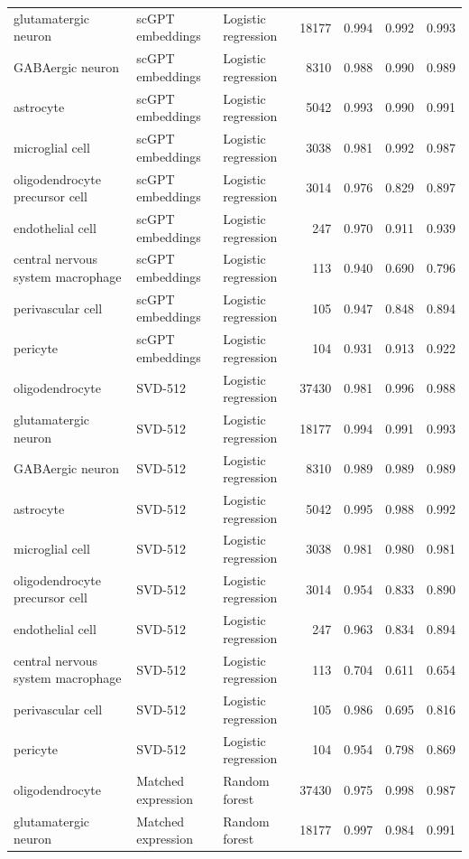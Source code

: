 {\begin{longtable}{>{\raggedright\arraybackslash}p{4.2cm}llrrrr}
glutamatergic neuron & scGPT embeddings & Logistic regression & 18177 & 0.994 & 0.992 & 0.993 \\
GABAergic neuron & scGPT embeddings & Logistic regression & 8310 & 0.988 & 0.990 & 0.989 \\
astrocyte & scGPT embeddings & Logistic regression & 5042 & 0.993 & 0.990 & 0.991 \\
microglial cell & scGPT embeddings & Logistic regression & 3038 & 0.981 & 0.992 & 0.987 \\
oligodendrocyte precursor cell & scGPT embeddings & Logistic regression & 3014 & 0.976 & 0.829 & 0.897 \\
endothelial cell & scGPT embeddings & Logistic regression & 247 & 0.970 & 0.911 & 0.939 \\
central nervous system macrophage & scGPT embeddings & Logistic regression & 113 & 0.940 & 0.690 & 0.796 \\
perivascular cell & scGPT embeddings & Logistic regression & 105 & 0.947 & 0.848 & 0.894 \\
pericyte & scGPT embeddings & Logistic regression & 104 & 0.931 & 0.913 & 0.922 \\
oligodendrocyte & SVD-512 & Logistic regression & 37430 & 0.981 & 0.996 & 0.988 \\
glutamatergic neuron & SVD-512 & Logistic regression & 18177 & 0.994 & 0.991 & 0.993 \\
GABAergic neuron & SVD-512 & Logistic regression & 8310 & 0.989 & 0.989 & 0.989 \\
astrocyte & SVD-512 & Logistic regression & 5042 & 0.995 & 0.988 & 0.992 \\
microglial cell & SVD-512 & Logistic regression & 3038 & 0.981 & 0.980 & 0.981 \\
oligodendrocyte precursor cell & SVD-512 & Logistic regression & 3014 & 0.954 & 0.833 & 0.890 \\
endothelial cell & SVD-512 & Logistic regression & 247 & 0.963 & 0.834 & 0.894 \\
central nervous system macrophage & SVD-512 & Logistic regression & 113 & 0.704 & 0.611 & 0.654 \\
perivascular cell & SVD-512 & Logistic regression & 105 & 0.986 & 0.695 & 0.816 \\
pericyte & SVD-512 & Logistic regression & 104 & 0.954 & 0.798 & 0.869 \\
oligodendrocyte & Matched expression & Random forest & 37430 & 0.975 & 0.998 & 0.987 \\
glutamatergic neuron & Matched expression & Random forest & 18177 & 0.997 & 0.984 & 0.991 \\

\end{longtable}}
